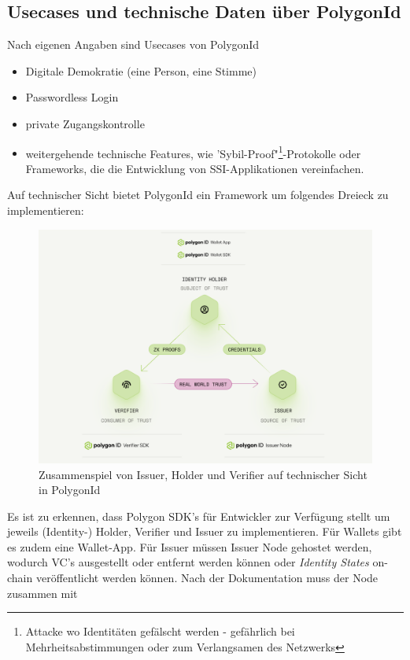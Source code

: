 \subsection{Usecases und technische Daten über PolygonId}
\label{technischeDatenPolygon}
Nach eigenen Angaben sind Usecases von PolygonId
\begin{itemize}
	\item Digitale Demokratie (eine Person, eine Stimme)
	\item Passwordless Login
	\item private Zugangskontrolle
	\item weitergehende technische Features, wie 'Sybil-Proof"\footnote{Attacke wo Identitäten gefälscht werden - gefährlich bei Mehrheitsabstimmungen oder zum Verlangsamen des Netzwerks}-Protokolle oder Frameworks, die die Entwicklung von SSI-Applikationen vereinfachen.
\end{itemize}
\newpage
Auf technischer Sicht bietet PolygonId ein Framework um folgendes Dreieck zu implementieren:
\begin{figure}[H]
	\centering
	\includegraphics[scale=0.3]{media/polygonIddreieck_inv.png}
	\caption{Zusammenspiel von Issuer, Holder und Verifier auf technischer Sicht in PolygonId \cite{ID31}}
	\label{fig:meine-grafik}
\end{figure}

Es ist zu erkennen, dass Polygon SDK's für Entwickler zur Verfügung stellt um jeweils (Identity-) Holder, Verifier und Issuer zu implementieren. Für Wallets gibt es zudem eine Wallet-App. Für Issuer müssen Issuer Node gehostet werden, wodurch VC's ausgestellt oder entfernt werden können oder \textsl{Identity States} on-chain veröffentlicht werden können. Nach der Dokumentation \cite{ID38} muss der Node zusammen mit 

